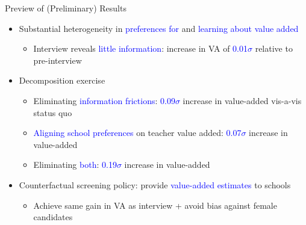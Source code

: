 \documentclass[compress,10pt,aspectratio=169]{beamer}
\newcommand\emphblue[1]{\textcolor{blue}{#1}}
\begin{document}
\begin{frame}{Preview of (Preliminary) Results}

    \begin{itemize}
    \item Substantial heterogeneity in \emphblue{preferences for} and \emphblue{learning about value added}
    \begin{itemize}
    \smallskip
        \item[$\Rightarrow$] Interview reveals \emphblue{little information}: increase in VA of \emphblue{0.01$\sigma$} relative to pre-interview
    \end{itemize}
    \bigskip
        \item Decomposition exercise
       \begin{itemize}
       \smallskip
    \item[$\Rightarrow$] Eliminating \emphblue{information frictions}: \emphblue{0.09$\sigma$} increase in value-added vis-a-vis status quo
    \medskip
    \item[$\Rightarrow$] \emphblue{Aligning school preferences} on teacher value added: \emphblue{0.07$\sigma$} increase in value-added
    \medskip
    \item[$\Rightarrow$] Eliminating \emphblue{both}: \emphblue{0.19$\sigma$} increase in value-added
\end{itemize}
        \bigskip
        \item Counterfactual screening policy: provide \emphblue{value-added estimates} to schools
        \begin{itemize}
            \smallskip
            \item[$\Rightarrow$] Achieve same gain in VA as interview + avoid bias against female candidates
        \end{itemize}
    \end{itemize}
\end{frame}
\end{document}
